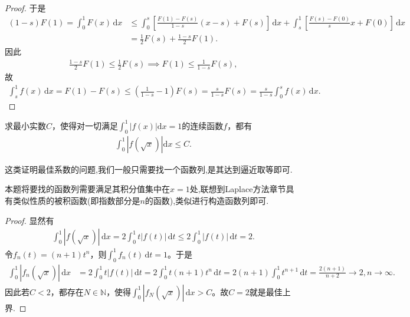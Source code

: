 \documentclass[../../main.tex]{subfiles}
\begin{document}
\begin{proof}
于是
\begin{align*}
(1 - s) F(1) = \int_0^1 F(x) \, \mathrm{d}x &\leqslant  \int_0^s \left[ \frac{F(1) - F(s)}{1 - s}(x - s) + F(s) \right] \, \mathrm{d}x + \int_s^1 \left[ \frac{F(s) - F(0)}{s}x + F(0) \right] \, \mathrm{d}x \\
&= \frac{1}{2} F(s) + \frac{1 - s}{2} F(1).
\end{align*}
因此
\begin{align*}
\frac{1 - s}{2} F(1) \leqslant  \frac{1}{2} F(s) \implies F(1) \leqslant  \frac{1}{1 - s} F(s),
\end{align*}
故
\begin{align*}
\int_s^1 f(x) \, \mathrm{d}x = F(1) - F(s) \leqslant  \left( \frac{1}{1 - s} - 1 \right) F(s) = \frac{s}{1 - s} F(s) = \frac{s}{1 - s} \int_0^s f(x) \, \mathrm{d}x.
\end{align*}

\end{proof}

\begin{example}
求最小实数$C$，使得对一切满足$\int_{0}^{1}|f(x)|\mathrm{d}x = 1$的连续函数$f$，都有
\begin{align*}
\int_{0}^{1}|f(\sqrt{x})|\mathrm{d}x \leqslant C.
\end{align*}
\end{example}
\begin{remark}
这类证明最佳系数的问题,我们一般只需要找一个函数列,是其达到逼近取等即可.

本题将要找的函数列需要满足其积分值集中在$x=1$处,联想到Laplace方法章节具有类似性质的被积函数(即指数部分是$n$的函数),类似进行构造函数列即可.
\end{remark}
\begin{proof}
显然有
\begin{align*}
\int_0^1 |f(\sqrt{x})| \, \mathrm{d}x = 2 \int_0^1 t |f(t)| \, \mathrm{d}t \leqslant 2 \int_0^1 |f(t)| \, \mathrm{d}t = 2.
\end{align*}
令$f_n(t) = (n+1) t^n$，则$\int_0^1 f_n(t) \, \mathrm{d}t = 1$。于是
\begin{align*}
\int_0^1 |f_n(\sqrt{x})| \, \mathrm{d}x &= 2 \int_0^1 t |f(t)| \, \mathrm{d}t = 2 \int_0^1 t (n+1) t^n \, \mathrm{d}t 
= 2 (n+1) \int_0^1 t^{n+1} \, \mathrm{d}t = \frac{2(n+1)}{n+2} \to 2, n \to \infty.
\end{align*}
因此若$C < 2$，都存在$N \in \mathbb{N}$，使得$\int_0^1 |f_N(\sqrt{x})| \, \mathrm{d}x > C$。故$C = 2$就是最佳上界.

\end{proof}
\end{document}

